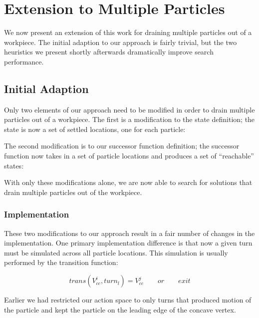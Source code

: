 \chapter{Extension to Multiple Particles}

We now present an extension of this work for draining multiple particles out of a workpiece. The initial adaption to our approach is fairly trivial, but the two heuristics we present shortly afterwards dramatically improve search performance.

\section{Initial Adaption}

Only two elements of our approach need to be modified in order to drain multiple particles out of a workpiece. The first is a modification to the state definition; the state is now a set of settled locations, one for each particle:

 {
  \label{eq:multipleParticleState}
}

The second modification is to our successor function definition; the successor function now takes in a set of particle locations and produces a set of ``reachable'' states:

 {
  \label{eq:successorMultipleParticle}
}

With only these modifications alone, we are now able to search for solutions that drain multiple particles out of the workpiece.

\subsection{Implementation}

These two modifications to our approach result in a fair number of changes in the implementation. One primary implementation difference is that now a given turn must be simulated across all particle locations. This simulation is usually performed by the transition function:

$$
trans(V_{cc}^{i}, turn_{l}) = V_{cc}^j \qquad or \qquad exit
$$

Earlier we had restricted our action space to only turns that produced motion of the particle and kept the particle on the leading edge of the concave vertex.

